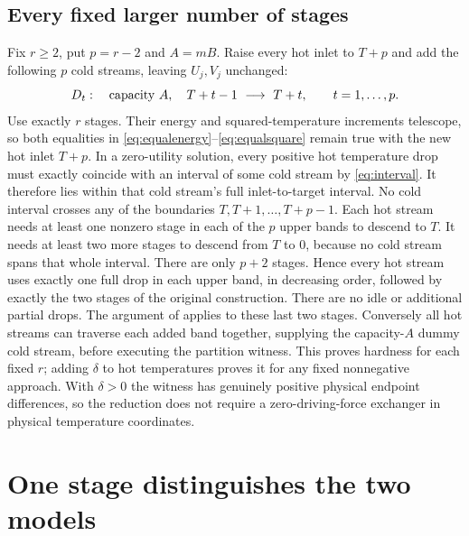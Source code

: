 \documentclass[11pt,a4paper]{report}
\begin{document}
\subsection{Every fixed larger number of stages}
Fix $r\geq2$, put $p=r-2$ and $A=mB$. Raise every hot inlet to $T+p$ and add
the following $p$ cold streams, leaving $U_j,V_j$ unchanged:
\begin{equation}\label{eq:padding}
 D_t:\quad \hbox{capacity }A,\quad T+t-1\ \longrightarrow\ T+t,
 \qquad t=1,\ldots,p.
\end{equation}
Use exactly $r$ stages. Their energy and squared-temperature increments
telescope, so both equalities in \eqref{eq:equalenergy}--\eqref{eq:equalsquare}
remain true with the new hot inlet $T+p$.
In a zero-utility solution, every positive hot temperature drop must exactly
coincide with an interval of some cold stream by \eqref{eq:interval}.
It therefore lies within that cold stream's full inlet-to-target interval.
No cold interval crosses any of the boundaries
$T,T+1,\ldots,T+p-1$. Each hot stream needs at least one nonzero stage in
each of the $p$ upper bands to descend to $T$. It needs at least two more
stages to descend from $T$ to 0, because no cold stream spans that whole
interval. There are only $p+2$ stages. Hence every hot stream uses exactly
one full drop in each upper band, in decreasing order, followed by exactly
the two stages of the original construction. There are no idle or additional
partial drops. The argument of  applies to these last two stages.
Conversely all hot streams can traverse each added band together, supplying
the capacity-$A$ dummy cold stream, before executing the partition witness.
This proves hardness for each fixed $r$; adding $\delta$ to hot temperatures
proves it for any fixed nonnegative approach. With $\delta>0$ the witness
has genuinely positive physical endpoint differences, so the reduction does
not require a zero-driving-force exchanger in physical temperature coordinates.

\section{One stage distinguishes the two models}
\end{document}
